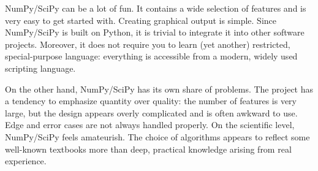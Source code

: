 % 

NumPy/SciPy can be a lot of fun. It contains a wide selection of
features and is very easy to get started with. Creating graphical
output is simple. Since NumPy/SciPy is built on Python, it is trivial
to integrate it into other software projects. Moreover, it does not
require you to learn (yet another) restricted, special-purpose
language: everything is accessible from a modern, widely used
scripting language.

On the other hand, NumPy/SciPy has its own share of problems. The
project has a tendency to emphasize quantity over quality: the number
of features is very large, but the design appears overly complicated
and is often awkward to use. Edge and error cases are not always
handled properly.
%
On the scientific level, NumPy/SciPy feels amateurish. The choice of
algorithms appears to reflect some well-known textbooks more than 
deep, practical knowledge arising from real experience.


